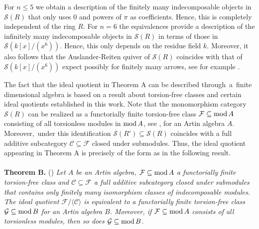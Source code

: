 \documentclass[a4paper]{amsart}
\renewcommand{\mod}{\textnormal{mod}\,}
\numberwithin{equation}{section} \theoremstyle{plain}
\numberwithin{thm}{section}
\begin{document}
For $n \leq 5$ we obtain a description of the finitely many indecomposable objects in $\mathcal{S}(R)$ that only uses $0$ and powers of $\pi$ as coefficients. Hence, this is completely independent of the ring $R$. For $n = 6$ the equivalences provide a description of the infinitely many indecomposable objects in $\mathcal{S}(R)$ in terms of those in $\mathcal{S}(k[x]/(x^6))$. Hence, this only depends on the residue field $k$. Moreover, it also follows that the Auslander-Reiten quiver of $\mathcal{S}(R)$ coincides with that of $\mathcal{S}(k[x]/(x^6))$ expect possibly for finitely many arrows,  see for example \cite[Lemma 1.1]{jorgensen}.

The fact that the ideal quotient in Theorem A can be described \mbox{through a finite} dimensional algebra is based on a result about torsion-free classes and certain ideal quotients established in this work. Note that the monomorphism category $\mathcal{S}(R)$ can be realized as a functorially finite torsion-free class $\mathcal{F} \subseteq \mod A$ consisting of all torsionless modules in $\mod A$, see \cite[Theorem 2.6]{kvamme}, for an Artin algebra $A$. \mbox{Moreover, under} this identification $\mathcal{S}(R') \subseteq \mathcal{S}(R)$ coincides with a full additive subcategory $\mathcal{C} \subseteq \mathcal{F}$ closed under submodules. Thus, the ideal quotient appearing in Theorem A is precisely of the form as in the following result.
\\
\\
\textbf{Theorem B.} () \emph{Let $A$ be an Artin algebra, $\mathcal{F} \subseteq \mod A$ a functorially finite torsion-free class and $\mathcal{C} \subseteq \mathcal{F}$ a full additive subcategory closed under submodules that contains only finitely many isomorphism classes of indecomposable modules. The ideal quotient $\mathcal{F}/ \langle \mathcal{C} \rangle$ is equivalent to a functorially finite torsion-free class $\mathcal{G} \subseteq \mod B$ for an Artin algebra $B$. Moreover, if $\mathcal{F} \subseteq \mod A$ consists of all torsionless modules, then so does $\mathcal{G} \subseteq \mod B$.}
\\
\end{document}
